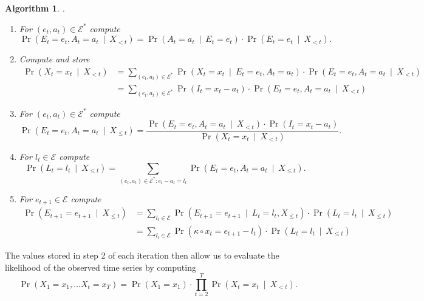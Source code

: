 \documentclass{article}
\newtheorem{algorithm}{Algorithm}
\begin{document}
\begin{algorithm}
.
\begin{enumerate}
\item For $(e_t, a_t) \in \mathcal{E}^*$ compute
$$
\Pr(E_t = e_t, A_t = a_t \ \mid \ X_{< t}) = \Pr(A_t = a_t \ \mid \ E_t = e_t)\cdot \Pr(E_t = e_t \ \mid \ X_{< t}).
$$
\item Compute and store
\begin{align*}
\Pr(X_t = x_t \ \mid \ X_{< t}) & = \sum_{(e_t, a_t) \in \mathcal{E}^*} \Pr(X_t = x_t \ \mid \ E_t = e_t, A_t = a_t) \cdot \Pr(E_t = e_t, A_t = a_t \ \mid \ X_{< t})\\
& = \sum_{(e_t, a_t) \in \mathcal{E}^*} \Pr(I_t = x_t - a_t) \cdot \Pr(E_t = e_t, A_t = a_t \ \mid \ X_{< t})
\end{align*}
\item For $(e_t, a_t) \in \mathcal{E}^*$ compute 
$$
\Pr(E_t = e_t, A_t = a_t \ \mid \ X_{\leq t}) = \frac{\Pr(E_t = e_t, A_t = a_t \ \mid \ X_{< t}) \cdot \Pr(I_t = x_t - a_t)}{\Pr(X_t = x_t \ \mid \ X_{< t})}.
$$
\item For $l_t \in \mathcal{E}$ compute
$$
\Pr(L_t = l_t \ \mid \ X_{\leq t}) = \sum_{(e_t, a_t) \in \mathcal{E}^*: e_t - a_t = l_t} \Pr(E_t = e_t, A_t = a_t \ \mid \ X_{\leq t}).
$$
\item For $e_{t + 1} \in \mathcal{E}$ compute
\begin{align*}
\Pr(E_{t + 1} = e_{t + 1} \ \mid \ X_{\leq t}) & = \sum_{l_t \in \mathcal{E}} \Pr(E_{t + 1} = e_{t + 1} \ \mid \ L_t = l_t, X_{\leq t}) \cdot \Pr(L_t = l_t \ \mid \ X_{\leq t})\\
& = \sum_{l_t \in \mathcal{E}} \Pr(\kappa \circ x_t = e_{t + 1} - l_t) \cdot \Pr(L_t = l_t \ \mid \ X_{\leq t})
\end{align*}
\end{enumerate}
\end{algorithm}
The values stored in step 2 of each iteration then allow us to evaluate the likelihood of the observed time series by computing
$$
\Pr(X_1 = x_1, \dots X_t = x_T) = \Pr(X_1 = x_1) \cdot \prod_{t = 2}^T \Pr(X_t = x_t \ \mid \ X_{< t}).
$$
\end{document}
